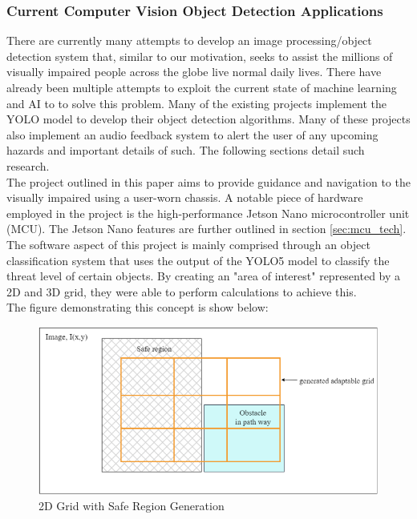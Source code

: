 \subsubsection{Current Computer Vision Object Detection Applications}
\noindent There are currently many attempts to develop an image processing/object detection system that, similar to our motivation, seeks to assist the millions of visually impaired people across the globe live normal daily lives. There have already been multiple attempts to exploit the current state of machine learning and AI to to solve this problem. Many of the existing projects implement the YOLO model to develop their object detection algorithms. Many of these projects also implement an audio feedback system to alert the user of any upcoming hazards and important details of such. The following sections detail such research. \\
    
\noindent The project outlined in this paper \cite{CVRef1} aims to provide guidance and navigation to the visually impaired using a user-worn chassis. A notable piece of hardware employed in the project is the high-performance Jetson Nano microcontroller unit (MCU). The Jetson Nano features are further outlined in section \ref{sec:mcu_tech}. \\

\noindent The software aspect of this project is mainly comprised through an object classification system that uses the output of the YOLO5 model to classify the threat level of certain objects. By creating an "area of interest" represented by a 2D and 3D grid, they were able to perform calculations to achieve this. \\

\noindent The figure demonstrating this concept is show below:
				
\begin{figure}[H]
	\centering
	\includegraphics[width=\textwidth]{./Images/Figure1_Grid_Detection.png}
	\caption{\label{fig:Grid-Generatio}2D Grid with Safe Region Generation \cite{CVRef1}}
\end{figure}

